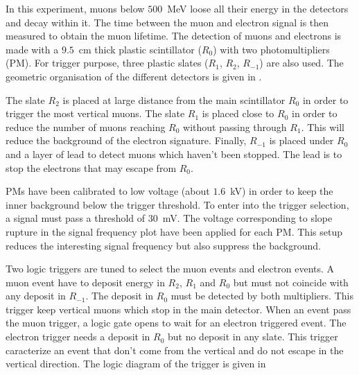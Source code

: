 In this experiment, muons below $500$~MeV loose all their energy in the detectors and decay within it.
The time between the muon and electron signal is then measured to obtain the muon lifetime.
The detection of muons and electrons is made with a $9.5$~cm thick plastic scintillator ($R_0$) with two photomultipliers (PM). 
For trigger purpose, three plastic slates ($R_1$, $R_2$, $R_{-1}$) are also used. 
The geometric organisation of the different detectors is given in .

The slate $R_2$ is placed at large distance from the main scintillator $R_0$ in order to trigger the most vertical muons.
The slate $R_1$ is placed close to $R_0$ in order to reduce the number of muons reaching $R_0$ without passing through $R_1$.
This will reduce the background of the electron signature.
Finally, $R_{-1}$ is placed under $R_0$ and a layer of lead to detect muons which haven't been stopped. 
The lead is to stop the electrons that may escape from $R_0$.

PMs have been calibrated to low voltage (about $1.6$~kV) in order to keep the inner background below the trigger threshold.
To enter into the trigger selection, a signal must pass a threshold of $30$~mV.
The voltage corresponding to slope rupture in the signal frequency plot have been applied for each PM.
This setup reduces the interesting signal frequency but also suppress the background.

Two logic triggers are tuned to select the muon events and  electron events.
A muon event have to deposit energy in $R_2$, $R_1$ and $R_0$ but must not coincide with any deposit in $R_{-1}$. 
The deposit in $R_0$ must be detected by both multipliers.
This trigger keep vertical muons which stop in the main detector.
When an event pass the muon trigger, a logic gate opens to wait for an electron triggered event.
The electron trigger needs a deposit in $R_0$ but no deposit in any slate. 
This trigger caracterize an event that don't come from the vertical and do not escape in the vertical direction.
The logic diagram of the trigger is given in 
